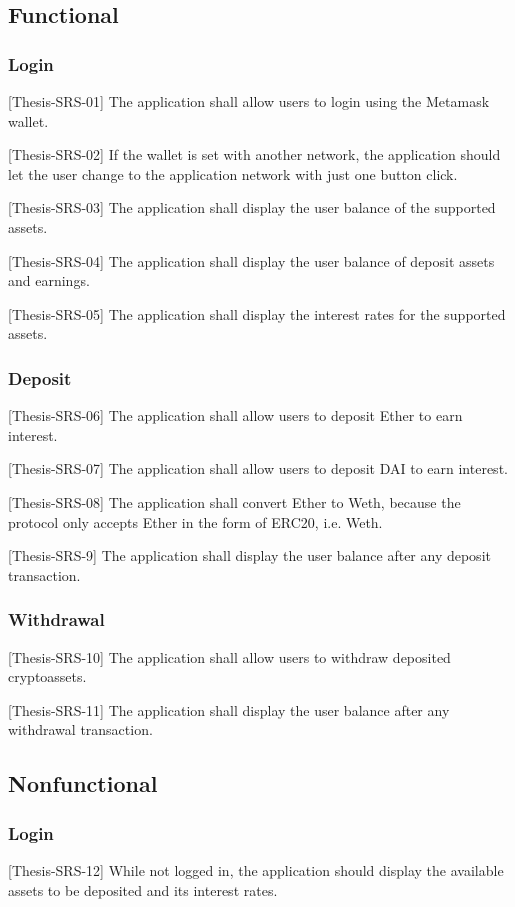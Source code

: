 \documentclass[11pt,a4paper]{report}
\begin{document}
\subsection{Functional}
\subsubsection{Login}
[Thesis-SRS-01] The application shall allow users to login using the Metamask\cite{wiki:MetaMask} wallet.

[Thesis-SRS-02]  If the wallet is set with another network, the application should let the user change to the application network with just one button click.

[Thesis-SRS-03] The application shall display the user balance of the supported assets.

[Thesis-SRS-04] The application shall display the user balance of deposit assets and earnings.

[Thesis-SRS-05] The application shall display the interest rates for the supported assets.
\subsubsection{Deposit}
[Thesis-SRS-06] The application shall allow users to deposit Ether to earn interest.

[Thesis-SRS-07] The application shall allow users to deposit DAI to earn interest.

[Thesis-SRS-08] The application shall convert Ether to Weth, because the protocol only accepts Ether in the form of ERC20, i.e. Weth.

[Thesis-SRS-9] The application shall display the user balance after any deposit transaction.

\subsubsection{Withdrawal}
[Thesis-SRS-10] The application shall allow users to withdraw deposited cryptoassets.

[Thesis-SRS-11] The application shall display the user balance after any withdrawal transaction.

\subsection{Nonfunctional}
\subsubsection{Login}
[Thesis-SRS-12] While not logged in, the application should display the available assets to be deposited and its interest rates. 
\end{document}
